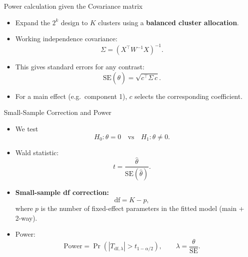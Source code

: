 \documentclass[aspectratio=169]{beamer} %
\begin{document}
\begin{frame}{Power calculation given the Covariance matrix}

\begin{itemize}
  \item Expand the $2^k$ design to $K$ clusters using a 
        \textbf{balanced cluster allocation}.

  \item Working independence covariance:
    \[
      \Sigma 
      = (X^\top W^{-1} X)^{-1}.
    \]

  \item This gives standard errors for any contrast:
    \[
      \mathrm{SE}(\hat\theta)
      = \sqrt{c^\top \Sigma\, c}.
    \]

  \item For a main effect (e.g.\ component 1),  
        $c$ selects the corresponding coefficient.
\end{itemize}

\end{frame}
\begin{frame}{Small-Sample Correction and Power}

\begin{itemize}

  \item We test 
    \[
      H_0 : \theta = 0
      \quad\text{vs}\quad
      H_1 : \theta \neq 0.
    \]

  \item Wald statistic:
    \[
      t = \frac{\hat\theta}{\mathrm{SE}(\hat\theta)}.
    \]

  \item \textbf{Small-sample df correction:}
    \[
      \text{df} = K - p,
    \]
    where $p$ is the number of fixed-effect parameters
    in the fitted model (main + 2-way).

  \item Power:
    \[
      \text{Power}
      = 
      \Pr(|T_{\text{df},\lambda}| > t_{1-\alpha/2}),
      \qquad
      \lambda = \frac{\theta}{\mathrm{SE}}.
    \]

\end{itemize}

\end{frame}
\end{document}
